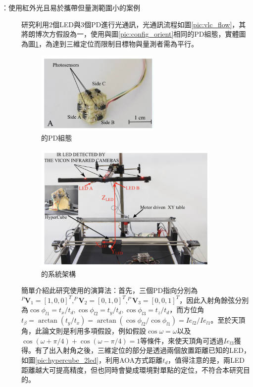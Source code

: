     \begin{description}
        \item[\cite{case:hypercube}：使用紅外光且易於攜帶但量測範圍小的案例]\hfill 
        
        \qquad
        \cite{case:hypercube}研究利用2個LED與3個PD進行光通訊，光通訊流程如圖\ref{pic:vlc_flow}，其將朗博次方假設為一，使用與圖\ref{pic:config_orient}相同的PD組態，實體圖為圖\ref{pic:hypercube_pd}，為達到三維定位而限制目標物與量測者需為平行。

        \begin{figure}[h]
            \centering
            \includegraphics[width=6cm]{ch2pic/hypercube_pd.png}
            \caption{\cite{case:hypercube}的PD組態}
            \label{pic:hypercube_pd}
        \end{figure}
        \begin{figure}[h]
            \centering
            \includegraphics[width=9cm]{ch2pic/hypercube_setup.png}
            \caption{\cite{case:hypercube}的系統架構}
            \label{pic:hypercube_setup}
        \end{figure}
        


        \qquad
        簡單介紹此研究使用的演算法：首先，三個PD指向分別為$^P\boldsymbol{V}_1=[1,0,0]^T,^P\boldsymbol{V}_2=[0,1,0]^T,^P\boldsymbol{V}_3=[0,0,1]^T$，因此入射角餘弦分別為$\cos\phi_{l1} = t_x/t_d,\cos\phi_{l2} = t_y/t_d,\cos\phi_{l3} = t_z/t_d$，而方位角$t_\beta = \arctan(t_y/t_x) = \arctan(\cos\phi_{l2}/\cos\phi_{l1})=Ie_{l2}/Ie_{l1}$。至於天頂角，此論文則是利用多項假設，例如假設$\cos\omega=\omega$以及$\cos(\omega+\pi/4)+\cos(\omega-\pi/4)=1$等條件，來使天頂角可透過$Ie_{l3}$獲得。有了出入射角之後，三維定位的部分是透過兩個放置距離已知的LED，如圖\ref{pic:hypercube_2led}，利用AOA方式距離$t_d$，值得注意的是，兩LED距離越大可提高精度，但也同時會變成環境對單點的定位，不符合本研究目的。


\end{description}
